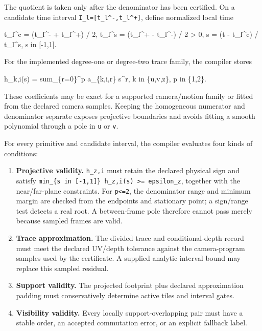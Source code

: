 \documentclass[
]{article}
\newenvironment{Shaded}{}{}
\newcommand{\NormalTok}[1]{#1}
\providecommand{\tightlist}{%
  \setlength{\itemsep}{0pt}\setlength{\parskip}{0pt}}
\begin{document}
The quotient is taken only after the denominator has been certified. On
a candidate time interval \texttt{I\_l={[}t\_l\^{}-,t\_l\^{}+{]}},
define normalized local time

\begin{Shaded}
\begin{Highlighting}[]
\NormalTok{t\_l\^{}c = (t\_l\^{}{-} + t\_l\^{}+) / 2,}
\NormalTok{t\_l\^{}s = (t\_l\^{}+ {-} t\_l\^{}{-}) / 2 \textgreater{} 0,}
\NormalTok{s     = (t {-} t\_l\^{}c) / t\_l\^{}s,       s in [{-}1,1].}
\end{Highlighting}
\end{Shaded}

For the implemented degree-one or degree-two trace family, the compiler
stores

\begin{Shaded}
\begin{Highlighting}[]
\NormalTok{h\_k,i(s) = sum\_\{r=0\}\^{}p a\_\{k,i,r\} s\^{}r,}
\NormalTok{k in \{u,v,z\},       p in \{1,2\}.}
\end{Highlighting}
\end{Shaded}

These coefficients may be exact for a supported camera/motion family or
fitted from the declared camera samples. Keeping the homogeneous
numerator and denominator separate exposes projective boundaries and
avoids fitting a smooth polynomial through a pole in \texttt{u} or
\texttt{v}.

For every primitive and candidate interval, the compiler evaluates four
kinds of conditions:

\begin{enumerate}
\def\labelenumi{\arabic{enumi}.}
\tightlist
\item
  \textbf{Projective validity.} \texttt{h\_z,i} must retain the declared
  physical sign and satisfy
  \texttt{min\_\{s\ in\ {[}-1,1{]}\}\ \textbar{}h\_z,i(s)\textbar{}\ \textgreater{}=\ epsilon\_z},
  together with the near/far-plane constraints. For
  \texttt{p\textless{}=2}, the denominator range and minimum margin are
  checked from the endpoints and stationary point; a sign/range test
  detects a real root. A between-frame pole therefore cannot pass merely
  because sampled frames are valid.
\item
  \textbf{Trace approximation.} The divided trace and conditional-depth
  record must meet the declared UV/depth tolerance against the
  camera-program samples used by the certificate. A supplied analytic
  interval bound may replace this sampled residual.
\item
  \textbf{Support validity.} The projected footprint plus declared
  approximation padding must conservatively determine active tiles and
  interval gates.
\item
  \textbf{Visibility validity.} Every locally support-overlapping pair
  must have a stable order, an accepted commutation error, or an
  explicit fallback label.
\end{enumerate}
\end{document}
